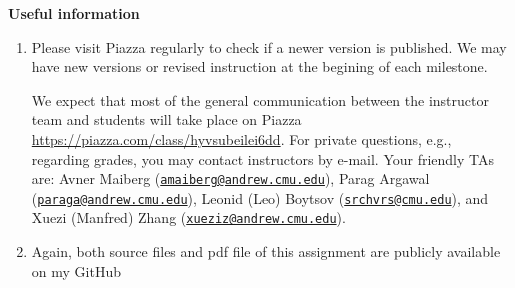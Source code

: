\documentclass[oneside]{memoir}
\begin{document}
\begin{titlingpage}
\begin{minipage}{1.2\textwidth}
\begin{comment}
\verb|**/*.java| and \verb|**/*.yaml| tell you that you don't need to flatten
your folder hierarchy, instead we encourage you to place your Java codes in the
right package, and similarly, you can create subfolders for different types of
descriptors, e.g., \verb|src/main/resources/hellobioqa/teamXX/keyterm| for all
the descriptors related to keyterm extraction task.

Actually, once you specify the main yaml descriptor of pipeline to the
\texttt{ECDDriver}, you can have your own entry point to the system. However, if
you want to use \texttt{launches/hellobioqa.launch} file to run the pipeline,
you should consider \texttt{src/main/resources/hellobioqa/hellobioqa.yaml} as
your main yaml. When we evaluate your codes, we will run a different main yaml
to bundle all your components, all the components declared in your
\texttt{hellobioqa.yaml} will be used.
\item \textbf{Comments, Javadocs, and documentations:} They are still important
if you want us and other users to better understand your code. (Remember: we
will become your customer when we run the big experiment.)

\end{enumerate}
\end{comment}
\end{minipage}
\hspace{-0.1\textwidth}

\hspace{-0.1\textwidth}
\begin{minipage}{1.2\textwidth}
 
\textbf{Useful information}
\begin{enumerate}

\item Please visit Piazza regularly to check if a newer version is published. We may have new versions or revised instruction at the begining of
each milestone.

We expect that most of the general communication between the instructor team and students will take place on Piazza
\url{https://piazza.com/class/hyvsubeilei6dd}.
For private questions, e.g., regarding grades, you may contact instructors by e-mail.
Your friendly TAs are:
Avner Maiberg (\href{mailto:amaiberg@andrew.cmu.edu}{\nolinkurl{amaiberg@andrew.cmu.edu}}), 
Parag Argawal (\href{mailto:paraga@andrew.cmu.edu}{\nolinkurl{paraga@andrew.cmu.edu}}), 
Leonid (Leo) Boytsov (\href{mailto:srchvrs@cmu.edu}{\nolinkurl{srchvrs@cmu.edu}}), and 
Xuezi (Manfred) Zhang (\href{mailto:xueziz@andrew.cmu.edu}{\nolinkurl{xueziz@andrew.cmu.edu}}).
\item Again, both source files and pdf file of this assignment are
publicly available on my GitHub
     

\end{enumerate}
\end{minipage}
\end{titlingpage}
\end{document}

